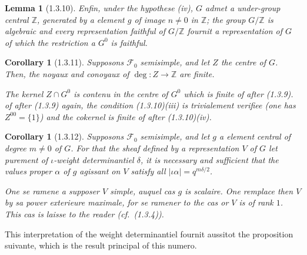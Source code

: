 \documentclass[12pt,a4paper]{article}
\theoremstyle{plain}
\newtheorem{lemma}[theorem]{Lemma}
\newtheorem{corollary}[theorem]{Corollary}
\theoremstyle{definition}
\theoremstyle{definition}
\theoremstyle{remark}
\begin{document}
\begin{lemma}[1.3.10]
Enfin, under the hypothese (iv), $G$ admet a under-group central $\mathbb{Z}$, generated by a element $g$ of image $n \neq 0$ in $\mathbb{Z}$; the group $G/\mathbb{Z}$ is algebraic and every representation faithful of $G/\mathbb{Z}$ fournit a representation of $G$ of which the restriction a $G^0$ is faithful.
\end{lemma}

\begin{corollary}[1.3.11]
Supposons $\mathscr{F}_0$ semisimple, and let $Z$ the centre of $G$. Then, the noyaux and conoyaux of $\deg : Z \to \mathbb{Z}$ are finite.

The kernel $Z \cap G^0$ is contenu in the centre of $G^0$ which is finite of after (1.3.9). of after (1.3.9) again, the condition (1.3.10)(iii) is trivialement verifiee (one has $Z^{00} = \{1\}$) and the cokernel is finite of after (1.3.10)(iv).
\end{corollary}

\begin{corollary}[1.3.12]
Supposons $\mathscr{F}_0$ semisimple, and let $g$ a element central of degree $m \neq 0$ of $G$. For that the sheaf defined by a representation $V$ of $G$ let purement of $\iota$-weight determinantiel $\delta$, it is necessary and sufficient that the values proper $\alpha$ of $g$ agissant on $V$ satisfy all $|\iota\alpha| = q^{m\delta/2}$.

One se ramene a supposer $V$ simple, auquel cas $g$ is scalaire. One remplace then $V$ by sa power exterieure maximale, for se ramener to the cas or $V$ is of rank $1$. This cas is laisse to the reader (cf.~(1.3.4)).
\end{corollary}

This interpretation of the weight determinantiel fournit aussitot the proposition suivante, which is the result principal of this numero.
\end{document}
